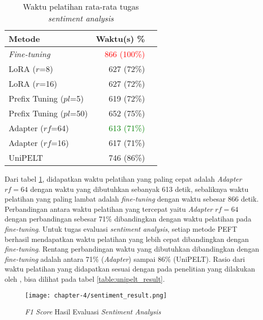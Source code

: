 \begin{table}[h]
    \centering
    \caption{Waktu pelatihan rata-rata tugas \textit{sentiment analysis}}
    \label{table:runtime-sentiment}
    \begin{tabular}{l|rr}
        \toprule
        \textbf{Metode} & \textbf{Waktu(s) \%} \\
        \midrule
        \textit{Fine-tuning} & \textcolor{Red}{866 (100\%)} \\
        LoRA ($r$=8) & 627 (72\%) \\
        LoRA ($r$=16) & 627 (72\%) \\
        Prefix Tuning ($pl$=5) & 619 (72\%) \\
        Prefix Tuning ($pl$=50) & 652 (75\%) \\
        Adapter ($rf$=64) & \textcolor{Green}{613 (71\%)} \\
        Adapter ($rf$=16) & 617 (71\%) \\
        UniPELT & 746 (86\%) \\
        \bottomrule
    \end{tabular}
\end{table}

Dari tabel \ref{table:runtime-sentiment}, didapatkan waktu pelatihan yang paling cepat adalah \textit{Adapter} $rf=64$ dengan waktu yang dibutuhkan sebanyak 613 detik, sebaliknya waktu pelatihan yang paling lambat adalah \textit{fine-tuning} dengan waktu sebesar 866 detik. Perbandingan antara waktu pelatihan yang tercepat yaitu \textit{Adapter} $rf=64$ dengan perbandingan sebesar 71\% dibandingkan dengan waktu pelatihan pada \textit{fine-tuning}. Untuk tugas evaluasi \textit{sentiment analysis}, setiap metode PEFT berhasil mendapatkan waktu pelatihan yang lebih cepat dibandingkan dengan \textit{fine-tuning}. Rentang perbandingan waktu yang dibutuhkan dibandingkan dengan \textit{fine-tuning} adalah antara 71\% (\textit{Adapter}) sampai 86\% (UniPELT). Rasio dari waktu pelatihan yang didapatkan sesuai dengan pada penelitian yang dilakukan oleh \citeauthor{unipelt}, bisa dilihat pada tabel \ref{table:unipelt_result}.

\begin{figure}[h]
    \centering
    \centerline{\texttt{[image: chapter-4/sentiment\_result.png]}}
    \caption{\textit{F1 Score} Hasil Evaluasi \textit{Sentiment Analysis}}
    \label{fig:sentiment-result}
\end{figure}

